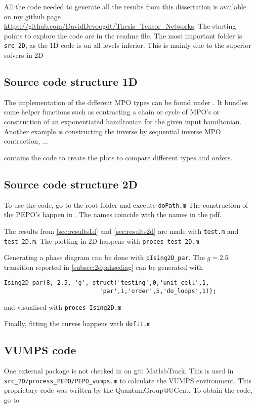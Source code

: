 
All the code needed to generate all the results from this dissertation is available on my github page \url{https://github.com/DavidDevoogdt/Thesis_Tensor_Networks}. The starting points to explore the code are in the readme file. The most important folder is \verb#src_2D#, as the 1D code is on all levels inferior. This is mainly due to the superior solvers in 2D

\subsection{Source code structure 1D}

The implementation of the different MPO types can be found under . It bundles some helper functions such as contracting a chain or cycle of MPO's or construction of an exponentiated hamiltonian for the given input hamiltonian. Another example is constructing the inverse by sequential inverse MPO contraction, ...

 contains the code to create the plots to compare different types and orders.

\subsection{Source code structure 2D}

To use the code, go to the root folder and execute  \verb#doPath.m#
The construction of the PEPO's happen in . The names coincide with the names in the pdf.

The results from \cref{sec:results1d} and \cref{sec:results2d} are made with  \verb#test.m# and \verb#test_2D.m#. The plotting in 2D happens with \verb#proces_test_2D.m#

Generating a phase diagram can be done with \verb#pIsing2D_par#. The $g=2.5$ transition reported in \cref{subsec:2dpahsediag} can be generated with
\begin{verbatim}
Ising2D_par(8, 2.5, 'g', struct('testing',0,'unit_cell',1,
                           'par',1,'order',5,'do_loops',1));
\end{verbatim}
and visualised with \verb#proces_Ising2D.m#

Finally, fitting the curves happens with \verb#dofit.m#

\subsection{VUMPS code}
One external package is not checked in on git: MatlabTrack. This is used in  \verb#src_2D/process_PEPO/PEPO_vumps.m# to calculate the VUMPS environment. This proprietary code was written by the QuantumGroup@UGent. To obtain the code, go to 
